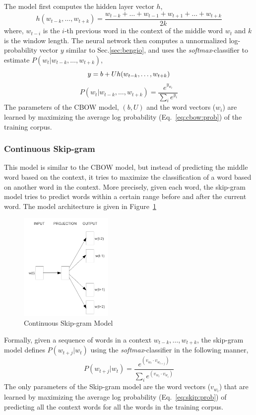 The model first computes the hidden layer vector $h$, 
\begin{equation}
h(w_{t-k}, \ldots, w_{t+k}) = \frac{w_{t-k} + \ldots + w_{t-1} + w_{t+1} + \dots + w_{t+k}}{2k}
\end{equation}
where, $w_{t-i}$ is the $i$-th previous word in the context of the middle word $w_{t}$ and $k$ is the window length.
The neural network then computes a unnormalized log-probability vector $y$ similar to Sec.\ref{sec:bengio}, and uses the \emph{softmax}-classifier to estimate $P(w_{t}|w_{t-k}, \ldots, w_{t+k})$,
\begin{equation}
y = b + Uh(w_{t-k}, \ldots, w_{t+k})\\
\end{equation}
\begin{equation}
\label{eq:cbow:prob}
P(w_{t}|w_{t-k}, \ldots, w_{t+k}) = \frac{e^{y_{w_t}}}{\sum_{i} e^{y_{i}}}
\end{equation}
The parameters of the CBOW model, $(b, U)$ and the word vectors ($w_{i}$) are learned by maximizing the average log probability (Eq.~\ref{eq:cbow:prob}) of the training corpus.

\subsubsection{Continuous Skip-gram}
This model is similar to the CBOW model, but instead of predicting the middle word based on the context, it tries to maximize the classification of a word based on another word in the context. More precisely, given each word, the skip-gram model tries to predict words within a certain range before and after the current word. The model architecture is given in Figure~\ref{fig:nn:skip}
\begin{figure}[h!]
    \centering
        \includegraphics[width=0.4\textwidth]{figs/mikolov_skip.png}
    \caption{Continuous Skip-gram Model }
    \label{fig:nn:skip}
\end{figure}
Formally, given a sequence of words in a context $w_{t-k}, \ldots, w_{t+k}$, the skip-gram model defines $P(w_{t+j}|w_{t})$ using the \emph{softmax}-classifier in the following manner,
\begin{equation}
\label{eq:skip:prob}
P(w_{t+j}|w_{t}) = \frac{e^{(v_{w_{t}} \cdot v_{w_{t+j}} )} }{\sum_{i} e^{(v_{w_{t}} \cdot v_{w_{i}})} }
\end{equation}
The only parameters of the Skip-gram model are the word vectors ($v_{w_{i}}$) that are learned by maximizing the average log probability (Eq.~\ref{eq:skip:prob}) of predicting all the context words for all the words in the training corpus.

